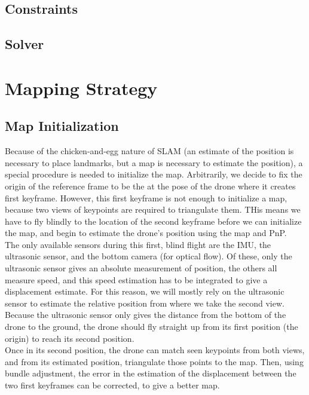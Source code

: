 \subsection{Constraints}

\subsection{Solver}


\section{Mapping Strategy}

\subsection{Map Initialization} %
Because of the chicken-and-egg nature of SLAM (an estimate of the position is necessary to place landmarks, but a map is necessary to estimate the position), a special procedure is needed to initialize the map. Arbitrarily, we decide to fix the origin of the reference frame to be the at the pose of the drone where it creates first keyframe. However, this first keyframe is not enough to initialize a map, because two views of keypoints are required to triangulate them. THis means we have to fly blindly to the location of the second keyframe before we can initialize the map, and begin to estimate the drone's position using the map and PnP.\\
The only available sensors during this first, blind flight are the IMU, the ultrasonic sensor, and the bottom camera (for optical flow). Of these, only the ultrasonic sensor gives an absolute measurement of position, the others all measure speed, and this speed estimation has to be integrated to give a displacement estimate. For this reason, we will mostly rely on the ultrasonic sensor to estimate the relative position from where we take the second view. Because the ultrasonic sensor only gives the distance from the bottom of the drone to the ground, the drone should fly straight up from its first position (the origin) to reach its second position.\\
Once in its second position, the drone can match seen keypoints from both views, and from its estimated position, triangulate those points to the map. Then, using bundle adjustment, the error in the estimation of the displacement between the two first keyframes can be corrected, to give a better map.

